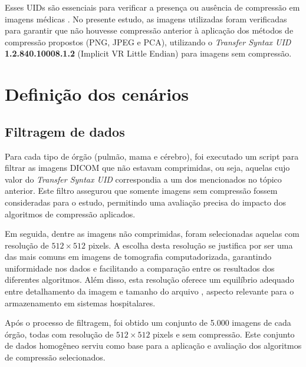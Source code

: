 Esses UIDs são essenciais para verificar a presença ou ausência de compressão em imagens médicas \cite{DICOMTransferSyntax}. No presente estudo, as imagens utilizadas foram verificadas para garantir que não houvesse compressão anterior à aplicação dos métodos de compressão propostos (\acrshort{PNG}, \acrshort{JPEG} e \acrshort{PCA}), utilizando o \textit{Transfer Syntax UID} \textbf{1.2.840.10008.1.2} (Implicit VR Little Endian) para imagens sem compressão.

\section{Definição dos cenários}




\subsection{Filtragem de dados}

Para cada tipo de órgão (pulmão, mama e cérebro), foi executado um script para filtrar as imagens DICOM que não estavam comprimidas, ou seja, aquelas cujo valor do \textit{Transfer Syntax UID} correspondia a um dos mencionados no tópico anterior. Este filtro assegurou que somente imagens sem compressão fossem consideradas para o estudo, permitindo uma avaliação precisa do impacto dos algoritmos de compressão aplicados.

Em seguida, dentre as imagens não comprimidas, foram selecionadas aquelas com resolução de $512 \times 512$ pixels. A escolha desta resolução se justifica por ser uma das mais comuns em imagens de tomografia computadorizada, garantindo uniformidade nos dados e facilitando a comparação entre os resultados dos diferentes algoritmos. Além disso, esta resolução oferece um equilíbrio adequado entre detalhamento da imagem e tamanho do arquivo \cite{hsieh2009computedDicomResolution512}, aspecto relevante para o armazenamento em sistemas hospitalares.

Após o processo de filtragem, foi obtido um conjunto de 5.000 imagens de cada órgão, todas com resolução de $512 \times 512$ pixels e sem compressão. Este conjunto de dados homogêneo serviu como base para a aplicação e avaliação dos algoritmos de compressão selecionados.

